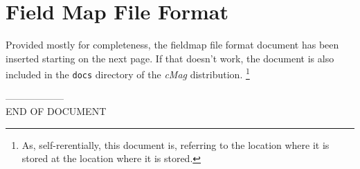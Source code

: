 \documentclass{article}
\begin{document}
\section{Field Map File Format}
Provided mostly for completeness, the fieldmap file format document has been inserted starting on the next page. If that doesn't work, the document is also included in the  \texttt{docs} directory of the \textit{cMag} distribution. \footnote{ As, self-rerentially, this document is, referring to the location where it is stored at the location where it is stored.}


------------------\\
END OF DOCUMENT
\end{document}

